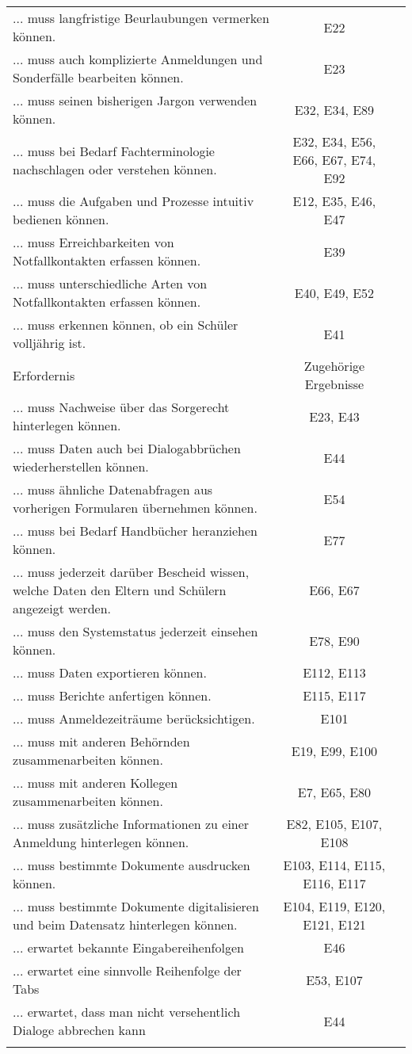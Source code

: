 \begin{landscape}
\begin{longtable}{p{15cm}cc}
... muss langfristige Beurlaubungen vermerken können. & E22 \\
... muss auch komplizierte Anmeldungen und Sonderfälle bearbeiten können. & E23 \\
... muss seinen bisherigen Jargon verwenden können. & E32, E34, E89 \\
... muss bei Bedarf Fachterminologie nachschlagen oder verstehen können. & E32, E34, E56, E66, E67, E74, E92 \\
... muss die Aufgaben und Prozesse intuitiv bedienen können. & E12, E35, E46, E47 \\
... muss Erreichbarkeiten von Notfallkontakten erfassen können. & E39 \\
... muss unterschiedliche Arten von Notfallkontakten erfassen können. & E40, E49, E52 \\
... muss erkennen können, ob ein Schüler volljährig ist. & E41 \\
        \endfirsthead
        \toprule
        Erfordernis & Zugehörige Ergebnisse \\
        \midrule
        \endhead
        \bottomrule
        \endfoot
... muss Nachweise über das Sorgerecht hinterlegen können. & E23, E43 \\
... muss Daten auch bei Dialogabbrüchen wiederherstellen können. & E44 \\
... muss ähnliche Datenabfragen aus vorherigen Formularen übernehmen können. & E54 \\
... muss bei Bedarf Handbücher heranziehen können. & E77 \\
... muss jederzeit darüber Bescheid wissen, welche Daten den Eltern und Schülern angezeigt werden. & E66, E67 \\
... muss den Systemstatus jederzeit einsehen können. & E78, E90 \\
... muss Daten exportieren können. & E112, E113 \\
... muss Berichte anfertigen können. & E115, E117 \\
... muss Anmeldezeiträume berücksichtigen. & E101 \\
... muss mit anderen Behörnden zusammenarbeiten können. & E19, E99, E100 \\
... muss mit anderen Kollegen zusammenarbeiten können. & E7, E65, E80 \\
... muss zusätzliche Informationen zu einer Anmeldung hinterlegen können. & E82, E105, E107, E108 \\
... muss bestimmte Dokumente ausdrucken können. & E103, E114, E115, E116, E117 \\
... muss bestimmte Dokumente digitalisieren und beim Datensatz hinterlegen können. & E104, E119, E120, E121, E121 \\
... erwartet bekannte Eingabereihenfolgen & E46 \\
... erwartet eine sinnvolle Reihenfolge der Tabs & E53, E107 \\
... erwartet, dass man nicht versehentlich Dialoge abbrechen kann & E44 \\
    \label{tab:erfordernisse}
\end{longtable}



\end{landscape}
